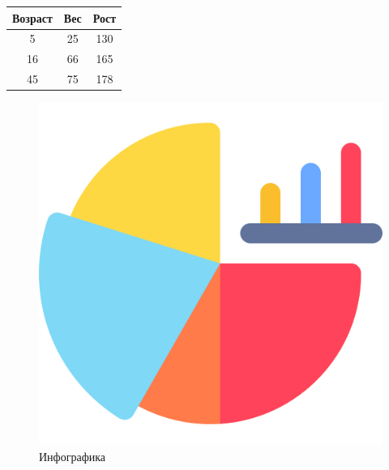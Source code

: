 \documentclass{article}
\begin{document}
\begin{tabular}{|c|c|c|}
\hline
Возраст & Вес & Рост \\
\hline
5 & 25 & 130 \\
\hline
16 & 66 & 165 \\
\hline
45 & 75 & 178 \\
\hline
\end{tabular}

\begin{figure}[ht]
\includegraphics{HW2/artifacts/graphics.png}
\caption{Инфографика}
\label{fig:image}
\end{figure}
\end{document}
